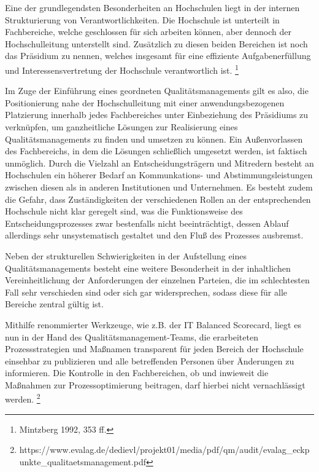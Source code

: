 \documentclass[a4paper]{article}
\begin{document}
\bigskip

{\sffamily
Eine der grundlegendsten Besonderheiten an Hochschulen liegt in der internen Strukturierung von Verantwortlichkeiten.
Die Hochschule ist unterteilt in Fachbereiche, welche geschlossen für sich arbeiten können, aber dennoch der
Hochschulleitung unterstellt sind. Zusätzlich zu diesen beiden Bereichen ist noch das Präsidium zu nennen, welches
insgesamt für eine effiziente Aufgabenerfüllung und Interessensvertretung der Hochschule verantwortlich ist.
\footnote{Mintzberg 1992, 353 ff. } }


\bigskip

{\sffamily
Im Zuge der Einführung eines geordneten Qualitätsmanagements gilt es also, die Positionierung nahe der Hochschulleitung
mit einer anwendungsbezogenen Platzierung innerhalb jedes Fachbereiches unter Einbeziehung des Präsidiums zu
verknüpfen, um ganzheitliche Lösungen zur Realisierung eines Qualitätsmanagements zu finden und umsetzen zu können. Ein
Außenvorlassen des Fachbereichs, in dem die Lösungen schließlich umgesetzt werden, ist faktisch unmöglich. Durch die
Vielzahl an Entscheidungsträgern und Mitredern besteht an Hochschulen ein höherer Bedarf an Kommunkations- und
Abstimmungsleistungen zwischen diesen als in anderen Institutionen und Unternehmen. Es besteht zudem die Gefahr, dass
Zuständigkeiten der verschiedenen Rollen an der entsprechenden Hochschule nicht klar geregelt sind, was die
Funktionsweise des Entscheidungsprozesses zwar bestenfalls nicht beeinträchtigt, dessen Ablauf allerdings sehr
unsystematisch gestaltet und den Fluß des Prozesses ausbremst.}


\bigskip

{\sffamily
Neben der strukturellen Schwierigkeiten in der Aufstellung eines Qualitätsmanagements besteht eine weitere Besonderheit
in der inhaltlichen Vereinheitlichung der Anforderungen der einzelnen Parteien, die im schlechtesten Fall sehr
verschieden sind oder sich gar widersprechen, sodass diese für alle Bereiche zentral gültig ist. }


\bigskip

{\sffamily
Mithilfe renommierter Werkzeuge, wie z.B. der IT Balanced Scorecard, liegt es nun in der Hand des
Qualitätsmanagement-Teams, die erarbeiteten Prozessstrategien und Maßnamen transparent für jeden Bereich der Hochschule
einsehbar zu publizieren und alle betreffenden Personen über Änderungen zu informieren. Die Kontrolle in den
Fachbereichen, ob und inwieweit die Maßnahmen zur Prozessoptimierung beitragen, darf hierbei nicht vernachlässigt
werden.
\footnote{https://www.evalag.de/dedievl/projekt01/media/pdf/qm/audit/evalag\_eckpunkte\_qualitaetsmanagement.pdf}}
\end{document}

